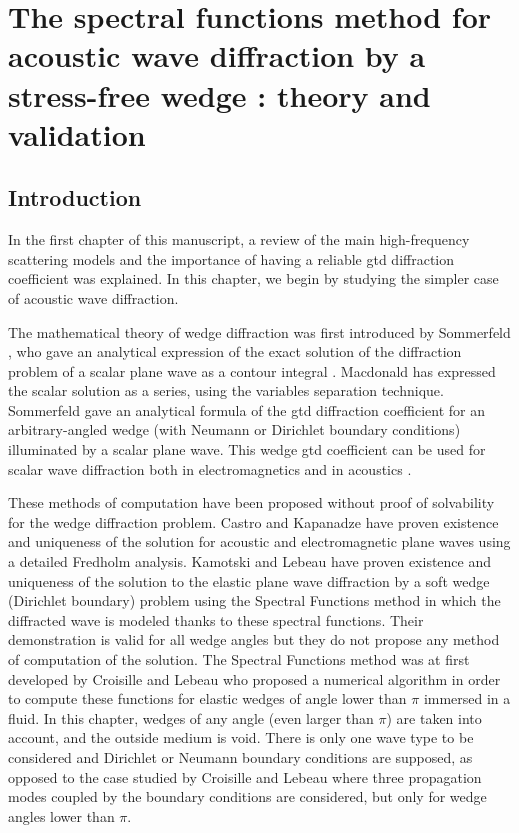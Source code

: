 \chapter[][Acoustic Case]{The spectral functions method for acoustic wave diffraction by a stress-free
wedge : theory and validation}
\label{chap-acoustic}


\section*{Introduction}
In the first chapter of this manuscript, a review of the main high-frequency scattering models and the importance of having a reliable \acrshort{gtd} diffraction coefficient was explained. In this chapter, we begin by studying the simpler case of acoustic wave diffraction.

The mathematical theory of wedge diffraction was first introduced by Sommerfeld \cite{Sommerfeld}, who gave an analytical expression of the exact solution of the diffraction problem of a scalar plane wave as a contour integral \cite{SMtechnique}. Macdonald \cite{Macdo} has expressed the scalar solution as a series, using the variables separation technique. Sommerfeld \cite{Sommerfeld} gave an analytical formula of the \acrfull{gtd} diffraction coefficient for an arbitrary-angled wedge (with Neumann or Dirichlet boundary conditions) illuminated by a scalar plane wave. This wedge \acrshort{gtd} coefficient can be used for scalar wave diffraction both in electromagnetics \cite{Kouyoumjian} and in acoustics \cite{Bouche,Bo}.

These methods of computation have been proposed without proof of solvability for the wedge diffraction problem. Castro and Kapanadze \cite{Castro} have proven existence and uniqueness of the solution for acoustic and electromagnetic plane waves using a detailed Fredholm analysis. Kamotski and Lebeau \cite{KamotskiLebeau} have proven existence and uniqueness of the solution to the elastic plane wave diffraction  by a soft wedge (Dirichlet boundary) problem using the Spectral Functions method in which the diffracted wave is modeled thanks to these spectral functions. Their demonstration is valid for all wedge angles but they do not propose any method of computation of the solution. The Spectral Functions method was at first developed by Croisille and Lebeau \cite{CroisilleLebeau} who proposed a numerical algorithm in order to compute these functions for elastic wedges of angle lower than $\pi$ immersed in a fluid. In this chapter, wedges of any angle (even larger than $\pi$) are taken into account, and the outside medium is void. There is only one wave type to be considered and Dirichlet or Neumann boundary conditions are supposed, as opposed to the case studied by Croisille and Lebeau \cite{CroisilleLebeau} where three propagation modes coupled by the boundary conditions are considered, but only for wedge angles lower than $\pi$.


